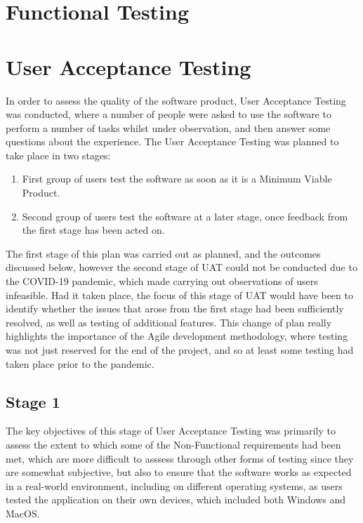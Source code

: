 \section{Functional Testing}


\section{User Acceptance Testing}
In order to assess the quality of the software product, User Acceptance Testing was conducted, where a number of people were asked to use the software to perform a number of tasks whilst under observation, and then answer some questions about the experience. The User Acceptance Testing was planned to take place in two stages:

\begin{enumerate}
  \item First group of users test the software as soon as it is a Minimum Viable Product.
  \item Second group of users test the software at a later stage, once feedback from the first stage has been acted on.
\end{enumerate}

The first stage of this plan was carried out as planned, and the outcomes discussed below, however the second stage of UAT could not be conducted due to the COVID-19 pandemic, which made carrying out observations of users infeasible. Had it taken place, the focus of this stage of UAT would have been to identify whether the issues that arose from the first stage had been sufficiently resolved, as well as testing of additional features. This change of plan really highlights the importance of the Agile development methodology, where testing was not just reserved for the end of the project, and so at least some testing had taken place prior to the pandemic.

\subsection{Stage 1}
The key objectives of this stage of User Acceptance Testing was primarily to assess the extent to which some of the Non-Functional requirements had been met, which are more difficult to asssess through other forms of testing since they are somewhat subjective, but also to ensure that the software works as expected in a real-world environment, including on different operating systems, as users tested the application on their own devices, which included both Windows and MacOS.

